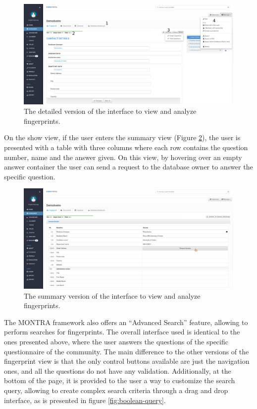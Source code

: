 \begin{figure}[H]
    \center
    \includegraphics[width=\textwidth]{fingerprint-show-detailed}
    \caption{The detailed version of the interface to view and analyze fingerprints.}
    \label{fig:fingerprint-show-detailed}
\end{figure}

On the show view, if the user enters the summary view (Figure \ref{fig:fingerprint-show-summary}), the user is presented with a table with three columns where each row contains the question number, name and the answer given.
On this view, by hovering over an empty answer container the user can send a request to the database owner to answer the specific question.

\begin{figure}
    \center
    \includegraphics[width=\textwidth]{fingerprint-show-summary}
    \caption{The summary version of the interface to view and analyze fingerprints.}
    \label{fig:fingerprint-show-summary}
\end{figure}

The MONTRA framework also offers an ``Advanced Search'' feature, allowing to perform searches for fingerprints.
The overall interface used is identical to the ones presented above, where the user answers the questions of the specific questionnaire of the community.
The main difference to the other versions of the fingerprint view is that the only control buttons available are just the navigation ones, and all the questions do not have any validation.
Additionally, at the bottom of the page, it is provided to the user a way to customize the search query, allowing to create complex search criteria through a drag and drop interface, as is presented in figure \ref{fig:boolean-query}.

